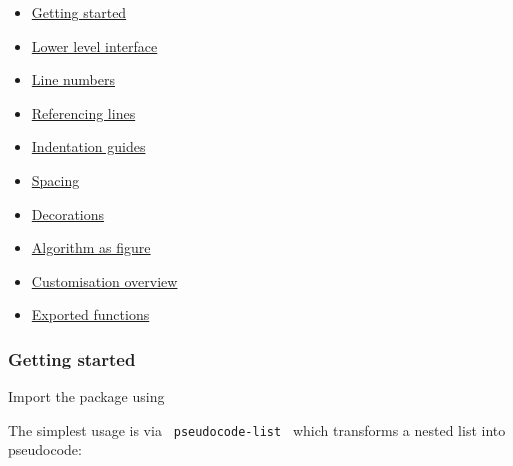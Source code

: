 \begin{itemize}
\tightlist
\item
  \href{https://github.com/typst/packages/raw/main/packages/preview/lovelace/0.3.0/\#getting-started}{Getting
  started}
\item
  \href{https://github.com/typst/packages/raw/main/packages/preview/lovelace/0.3.0/\#lower-level-interface}{Lower
  level interface}
\item
  \href{https://github.com/typst/packages/raw/main/packages/preview/lovelace/0.3.0/\#line-numbers}{Line
  numbers}
\item
  \href{https://github.com/typst/packages/raw/main/packages/preview/lovelace/0.3.0/\#referencing-lines}{Referencing
  lines}
\item
  \href{https://github.com/typst/packages/raw/main/packages/preview/lovelace/0.3.0/\#indentation-guides}{Indentation
  guides}
\item
  \href{https://github.com/typst/packages/raw/main/packages/preview/lovelace/0.3.0/\#spacing}{Spacing}
\item
  \href{https://github.com/typst/packages/raw/main/packages/preview/lovelace/0.3.0/\#decorations}{Decorations}
\item
  \href{https://github.com/typst/packages/raw/main/packages/preview/lovelace/0.3.0/\#algorithm-as-figure}{Algorithm
  as figure}
\item
  \href{https://github.com/typst/packages/raw/main/packages/preview/lovelace/0.3.0/\#customisation-overview}{Customisation
  overview}
\item
  \href{https://github.com/typst/packages/raw/main/packages/preview/lovelace/0.3.0/\#exported-functions}{Exported
  functions}
\end{itemize}

\subsubsection{Getting started}\label{getting-started}

Import the package using

\begin{Shaded}
\begin{Highlighting}[]
\end{Highlighting}
\end{Shaded}

The simplest usage is via \texttt{\ pseudocode-list\ } which transforms
a nested list into pseudocode:

